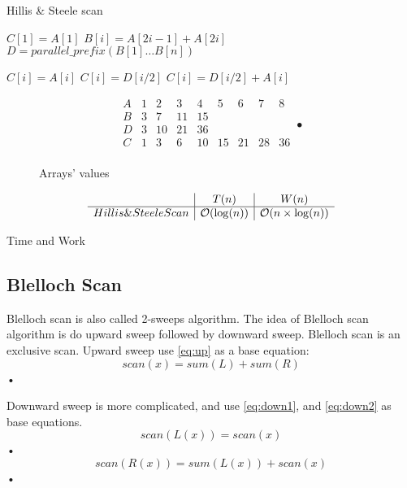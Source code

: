 \documentclass[twoside]{article}
\renewcommand{\O}[1]{$\mathcal{O}(#1)$}
\begin{document}
\begin{algorithm}
\caption{Hillis \& Steele scan}
\begin{algorithmic}[1]
		\State $C[1] = A[1]$
	\EndIf
		\State $B[i] = A[2i - 1] + A[2i]$
	\EndParFor
	\State $D = parallel{\_}prefix(B[1] \ldots B[n])$

			\State $C[i] = A[i]$
			\State $C[i] = D[i/2]$
			\State $C[i] = D[i/2] + A[i]$
		\EndIf
	\EndParFor
\EndProcedure
\end{algorithmic}
\end{algorithm}
\begin{figure}[H]
\centering
\[
\begin{array}{l|cccccccc}
A & 1 & 2 & 3 & 4 & 5 & 6 & 7 & 8\\
\hline
B & 3 & 7 & 11 & 15 &  &  &  & \\
D & 3 & 10 & 21 & 36 &  &  &  & \\
\hline
C & 1 & 3 & 6 & 10 & 15 & 21 & 28 & 36 \\
\end{array}•
\]
\caption{Arrays' values}
\end{figure}
\begin{table}[ht]
\[
\begin{array}{c|c|c}
 & T(n) & W(n)\\
\hline
Hillis \& Steele Scan & $\O{\log(n)}$ & $\O{n \times \log(n)}$\\
\end{array}
\]
\caption{Time and Work}
\end{table}

\subsection{Blelloch Scan}
Blelloch scan is also called 2-sweeps algorithm. The idea of Blelloch scan algorithm is do upward sweep followed by downward sweep. Blelloch scan is an exclusive scan. Upward sweep use \ref{eq:up} as a base equation:
\begin{equation}\label{eq:up}
scan(x) = sum(L) + sum(R)
\end{equation}•

Downward sweep is more complicated, and use \ref{eq:down1}, and \ref{eq:down2} as base equations.
\begin{equation}\label{eq:down1}
scan(L(x)) = scan(x)
\end{equation}•
\begin{equation}\label{eq:down2}
scan(R(x)) = sum(L(x)) + scan(x)
\end{equation}•
\end{document}
